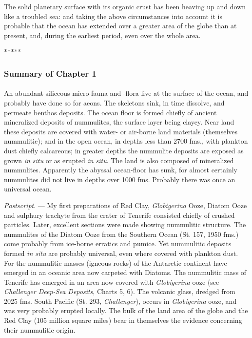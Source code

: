 \documentclass[a4paper, 12pt, oneside]{article}
\begin{document}
The solid planetary surface with its organic crust has been heaving up and down like a troubled sea: and taking the above circumstances into account it is probable that the ocean has extended over a greater area of the globe than at present, and, during the earliest period, even over the whole area.

\centerline{*\hspace{15mm}*\hspace{15mm}*\hspace{15mm}*\hspace{15mm}*}
\bigskip

\subsubsection{Summary of Chapter 1}
\paragraph{}
An abundant siliceous micro-fauna and -flora live at the surface of the ocean, and probably have done so for aeons. The skeletons sink, in time dissolve, and permeate benthos deposits. The ocean floor is formed chiefly of ancient mineralized deposits of nummulites, the surface layer being clayey. Near land these deposits are covered with water- or air-borne land materials (themselves nummulitic); and in the open ocean, in depths less than 2700 fms., with plankton dust chiefly calcareous; in greater depths the nummulite deposits are exposed as grown \emph{in situ} or as erupted \emph{in situ}. The land is also composed of mineralized nummulites. Apparently the abyssal ocean-floor has sunk, for almost certainly nummulites did not live in depths over 1000 fms. Probably there was once an universal ocean.

\emph{Postscript}. --- My first preparations of Red Clay, \emph{Globigerina} Ooze, Diatom Ooze and sulphury trachyte from the crater of Tenerife consisted chiefly of crushed particles. Later, excellent sections were made showing nummulitic structure. The nummulites of the Diatom Ooze from the Southern Ocean (St. 157, 1950 fms.) come probably from ice-borne erratics and pumice. Yet nummulitic deposits formed \emph{in situ} are probably universal, even where covered with plankton dust. For the nummulitic masses (igneous rocks) of the Antarctic continent have emerged in an oceanic area now carpeted with Diatoms. The nummulitic mass of Tenerife has emerged in an area now covered with \emph{Globigerina} ooze (see \emph{Challenger Deep-Sea Deposits}, Charts 5, 6). The volcanic glass, dredged from 2025 fms. South Pacific (St. 293, \emph{Challenger}), occurs in \emph{Globigerina} ooze, and was very probably erupted locally. The bulk of the land area of the globe and the Red Clay (105 million square miles) bear in themselves the evidence concerning their nummulitic origin.
\end{document}
